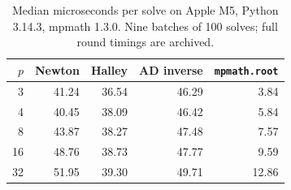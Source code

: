\begin{table}[htbp]\centering\small
\caption{Median microseconds per solve on Apple M5, Python 3.14.3, mpmath 1.3.0. Nine batches of 100 solves; full round timings are archived.}\label{tab:digital}
\begin{tabular}{@{}rrrrr@{}}\toprule
$p$ & Newton & Halley & AD inverse & \texttt{mpmath.root}\\\midrule
3 & 41.24 & 36.54 & 46.29 & 3.84\\
4 & 40.45 & 38.09 & 46.42 & 5.84\\
8 & 43.87 & 38.27 & 47.48 & 7.57\\
16 & 48.76 & 38.73 & 47.77 & 9.59\\
32 & 51.95 & 39.30 & 49.71 & 12.86\\
\bottomrule\end{tabular}\end{table}
